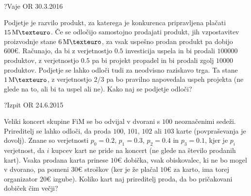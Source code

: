 \begin{naloga}{?}{Vaje OR 30.3.2016}
\begin{vprasanje}
Podjetje je razvilo produkt,
za katerega je konkurenca pripravljena plačati $15 \ME$.
Če se odločijo samostojno prodajati produkt,
jih vzpostavitev proizvodnje stane $6 \ME$,
za vsak uspešno prodan produkt pa dobijo $600 €$.
Računajo, da bi z verjetnostjo $0.5$ investicija uspela
in bi prodali $100000$ produktov,
z verjetnostjo $0.5$ pa bi projekt propadel
in bi prodali zgolj $10000$ produktov.
Podjetje se lahko odloči tudi za neodvisno raziskavo trga.
Ta stane $1 \ME$,
z verjetnostjo $2/3$ pa bo pravilno napovedala uspeh projekta
(ne glede na to, ali bi ta uspel ali ne).
Kako naj se podjetje odloči?

\end{vprasanje}
\begin{odgovor}
\end{odgovor}
\end{naloga}


\begin{naloga}{?}{Izpit OR 24.6.2015}
\begin{vprasanje}
Veliki koncert skupine FiM
se bo odvijal v dvorani s $100$ neoznačenimi sedeži.
Prireditelj se lahko odloči, da proda $100$, $101$, $102$ ali $103$ karte
(povpraševanja je dovolj).
Znane so verjetnosti $p_0 = 0.2$, $p_1 = 0.3$, $p_2 = 0.4$ in $p_3 = 0.1$,
kjer je $p_i$ verjetnost, da $i$ kupcev kart ne pride na koncert
(ne glede na število prodanih kart).
Vsaka prodana karta prinese $10 €$ dobička,
vsak obiskovalec, ki ne bo mogel v dvorano, pa pomeni $30 €$ stroškov
(ker je že plačal $10 €$ za karto, ima torej organizator $20 €$ izgube).
Koliko kart naj prireditelj proda, da bo pričakovani dobiček čim večji?

\end{vprasanje}
\begin{odgovor}
\end{odgovor}
\end{naloga}


